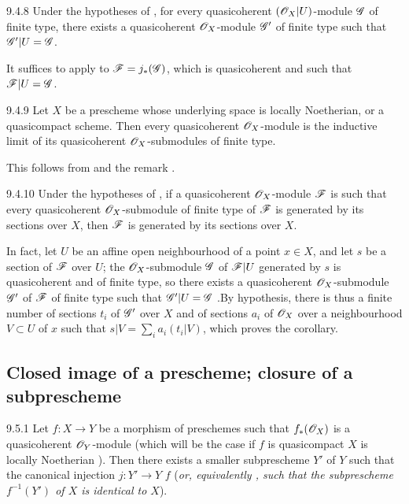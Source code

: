 \documentclass[10pt,oneside]{book}
\begin{document}
\begin{envs}[Corollary]{9.4.8}
\label{cor-1.9.4.8}
Under the hypotheses of , for every quasicoherent $(\mathscr{O}_X|U)$-module
$\mathscr{G}$ of finite type, there exists a quasicoherent $\mathscr{O}_X$-module $\mathscr{G}'$
of finite type such that $\mathscr{G}'|U=\mathscr{G}$.
\end{envs}

It suffices to apply  to $\mathscr{F}=j_*(\mathscr{G})$, which is
quasicoherent  and such that $\mathscr{F}|U=\mathscr{G}$.

\begin{envs}[Corollary]{9.4.9}
\label{cor-1.9.4.9}
Let $X$ be a prescheme whose underlying space is locally Noetherian, or a
quasicompact scheme. Then every quasicoherent $\mathscr{O}_X$-module is the inductive limit
of its quasicoherent $\mathscr{O}_X$-submodules of finite type.
\end{envs}

This follows from  and the remark .

\begin{envs}[Corollary]{9.4.10}
\label{cor-1.9.4.10}
Under the hypotheses of , if a quasicoherent $\mathscr{O}_X$-module $\mathscr{F}$
is such that every quasicoherent $\mathscr{O}_X$-submodule of finite type of $\mathscr{F}$ is
generated by its sections over $X$, then $\mathscr{F}$ is generated by its sections
over $X$.
\end{envs}

In fact, let $U$ be an affine open neighbourhood of a point $x\in X$, and let
$s$ be a section of $\mathscr{F}$ over $U$; the $\mathscr{O}_X$-submodule $\mathscr{G}$ of
$\mathscr{F}|U$ generated by $s$ is quasicoherent and of finite type, so there
exists a quasicoherent $\mathscr{O}_X$-submodule $\mathscr{G}'$ of $\mathscr{F}$ of finite
type such that $\mathscr{G}'|U=\mathscr{G}$ .By hypothesis, there is thus a
finite number of sections $t_i$ of $\mathscr{G}'$ over $X$ and of sections $a_i$
of $\mathscr{O}_X$ over a neighbourhood $V\subset U$ of $x$ such that
$s|V=\sum_i a_i(t_i|V)$, which proves the corollary.

\subsection{Closed image of a prescheme; closure of a subprescheme}
\label{1-schemes-9.5}        

\begin{envs}[Proposition]{9.5.1}
\label{prop-1.9.5.1}
Let $f:X\to Y$ be a morphism of preschemes
such that $f_*(\mathscr{O}_X)$ is a quasicoherent $\mathscr{O}_Y$-module (which will be the
case if $f$ is quasicompact  $X$ is locally Noetherian
). Then there exists a smaller subprescheme $Y'$ of $Y$ such that
the canonical injection $j:Y'\to Y$ \completelyunsure $f$ (\emph{or, equivalently
, such that the subprescheme $f^{-1}(Y')$ of $X$ is \emph{identical}
to $X$}).
\end{envs}
\end{document}
